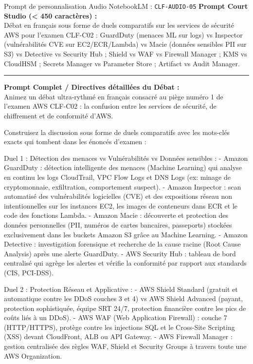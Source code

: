 \documentclass[11pt,a4paper]{article}
\begin{document}
\begin{promptbox}{Prompt de personnalisation Audio NotebookLM : \texttt{CLF-AUDIO-05}}
\textbf{Prompt Court Studio (< 450 caractères) :}\\
Débat en français sous forme de duels comparatifs sur les services de sécurité AWS pour l'examen CLF-C02 : GuardDuty (menaces ML sur logs) vs Inspector (vulnérabilités CVE sur EC2/ECR/Lambda) vs Macie (données sensibles PII sur S3) vs Detective vs Security Hub ; Shield vs WAF vs Firewall Manager ; KMS vs CloudHSM ; Secrets Manager vs Parameter Store ; Artifact vs Audit Manager.

\medskip\hrule\medskip
\textbf{Prompt Complet / Directives détaillées du Débat :}\\
Animez un débat ultra-rythmé en français consacré au piège numéro 1 de l'examen AWS CLF-C02 : la confusion entre les services de sécurité, de chiffrement et de conformité d'AWS.

Construisez la discussion sous forme de duels comparatifs avec les mots-clés exacts qui tombent dans les énoncés d'examen :

Duel 1 : Détection des menaces vs Vulnérabilités vs Données sensibles :
- Amazon GuardDuty : détection intelligente des menaces (Machine Learning) qui analyse en continu les logs CloudTrail, VPC Flow Logs et DNS Logs (ex: minage de cryptomonnaie, exfiltration, comportement suspect).
- Amazon Inspector : scan automatisé des vulnérabilités logicielles (CVE) et des expositions réseau non intentionnelles sur les instances EC2, les images de conteneurs dans ECR et le code des fonctions Lambda.
- Amazon Macie : découverte et protection des données personnelles (PII, numéros de cartes bancaires, passeports) stockées exclusivement dans les buckets Amazon S3 grâce au Machine Learning.
- Amazon Detective : investigation forensique et recherche de la cause racine (Root Cause Analysis) après une alerte GuardDuty.
- AWS Security Hub : tableau de bord centralisé qui agrège les alertes et vérifie la conformité par rapport aux standards (CIS, PCI-DSS).

Duel 2 : Protection Réseau et Applicative :
- AWS Shield Standard (gratuit et automatique contre les DDoS couches 3 et 4) vs AWS Shield Advanced (payant, protection sophistiquée, équipe SRT 24/7, protection financière contre les pics de coûts liés à un DDoS).
- AWS WAF (Web Application Firewall) : couche 7 (HTTP/HTTPS), protège contre les injections SQL et le Cross-Site Scripting (XSS) devant CloudFront, ALB ou API Gateway.
- AWS Firewall Manager : gestion centralisée des règles WAF, Shield et Security Groups à travers toute une AWS Organization.


\end{promptbox}
\end{document}
